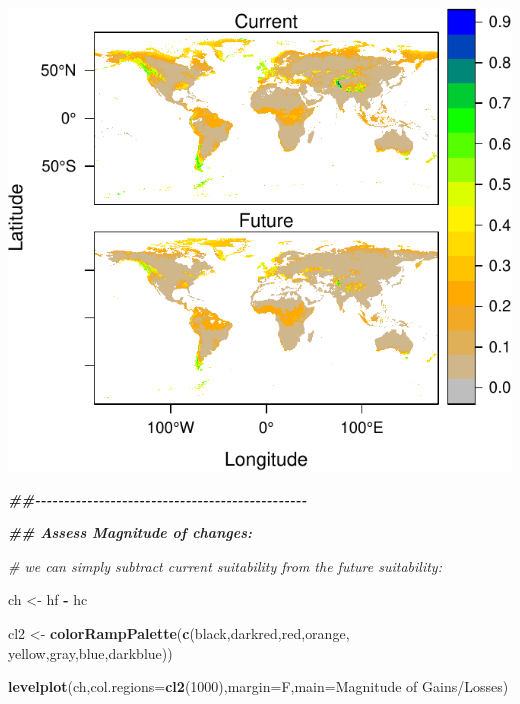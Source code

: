 \documentclass[
]{article}
\newenvironment{Shaded}{\begin{snugshade}}{\end{snugshade}}
\newcommand{\AttributeTok}[1]{\textcolor[rgb]{0.13,0.29,0.53}{#1}}
\newcommand{\CommentTok}[1]{\textcolor[rgb]{0.56,0.35,0.01}{\textit{#1}}}
\newcommand{\DecValTok}[1]{\textcolor[rgb]{0.00,0.00,0.81}{#1}}
\newcommand{\DocumentationTok}[1]{\textcolor[rgb]{0.56,0.35,0.01}{\textbf{\textit{#1}}}}
\newcommand{\FunctionTok}[1]{\textcolor[rgb]{0.13,0.29,0.53}{\textbf{#1}}}
\newcommand{\NormalTok}[1]{#1}
\newcommand{\OtherTok}[1]{\textcolor[rgb]{0.56,0.35,0.01}{#1}}
\newcommand{\SpecialCharTok}[1]{\textcolor[rgb]{0.81,0.36,0.00}{\textbf{#1}}}
\newcommand{\StringTok}[1]{\textcolor[rgb]{0.31,0.60,0.02}{#1}}
\begin{document}
\includegraphics{sdm_R_files/figure-latex/unnamed-chunk-11-5.pdf}

\begin{Shaded}
\begin{Highlighting}[]
\DocumentationTok{\#\#{-}{-}{-}{-}{-}{-}{-}{-}{-}{-}{-}{-}{-}{-}{-}{-}{-}{-}{-}{-}{-}{-}{-}{-}{-}{-}{-}{-}{-}{-}{-}{-}{-}{-}{-}{-}{-}{-}{-}{-}{-}{-}{-}{-}{-}{-}{-}}

\DocumentationTok{\#\# Assess Magnitude of changes:}

\CommentTok{\# we can simply subtract current suitability from the future suitability:}

\NormalTok{ch }\OtherTok{\textless{}{-}}\NormalTok{ hf }\SpecialCharTok{{-}}\NormalTok{ hc}

\NormalTok{cl2 }\OtherTok{\textless{}{-}} \FunctionTok{colorRampPalette}\NormalTok{(}\FunctionTok{c}\NormalTok{(}\StringTok{\textquotesingle{}black\textquotesingle{}}\NormalTok{,}\StringTok{\textquotesingle{}darkred\textquotesingle{}}\NormalTok{,}\StringTok{\textquotesingle{}red\textquotesingle{}}\NormalTok{,}\StringTok{\textquotesingle{}orange\textquotesingle{}}\NormalTok{,}
                          \StringTok{\textquotesingle{}yellow\textquotesingle{}}\NormalTok{,}\StringTok{\textquotesingle{}gray\textquotesingle{}}\NormalTok{,}\StringTok{\textquotesingle{}blue\textquotesingle{}}\NormalTok{,}\StringTok{\textquotesingle{}darkblue\textquotesingle{}}\NormalTok{))}

\FunctionTok{levelplot}\NormalTok{(ch,}\AttributeTok{col.regions=}\FunctionTok{cl2}\NormalTok{(}\DecValTok{1000}\NormalTok{),}\AttributeTok{margin=}\NormalTok{F,}\AttributeTok{main=}\StringTok{\textquotesingle{}Magnitude of Gains/Losses\textquotesingle{}}\NormalTok{)}
\end{Highlighting}
\end{Shaded}
\end{document}
